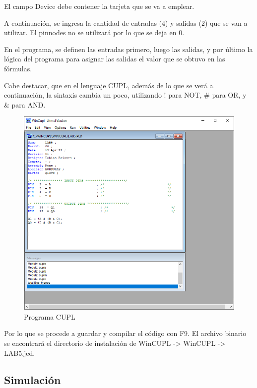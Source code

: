 \documentclass{article}
\begin{document}
    El campo Device debe contener la tarjeta que se va a emplear.

    \bigbreak

    A continuación, se ingresa la cantidad de entradas ($4$) y salidas ($2$) que se van a utilizar. El pinnodes no se utilizará por lo que se deja en $0$.


    \bigbreak

    En el programa, se definen las entradas primero, luego las salidas, y por último la lógica del programa para asignar las salidas el valor que se obtuvo en las fórmulas.

    \bigbreak

    Cabe destacar, que en el lenguaje CUPL, además de lo que se verá a continuación, la sintaxis cambia un poco, utilizando ! para NOT, \# para OR, y \& para AND.

    \begin{figure}[H]
        \centering
        \includegraphics[width=0.5\paperwidth]{images/wincupl-program}
        \caption{Programa CUPL}
    \end{figure}

    Por lo que se procede a guardar y compilar el código con F9. El archivo binario se encontrará el directorio de instalación de WinCUPL -> WinCUPL -> LAB5.jed.

    \subsection{Simulación}
\end{document}
